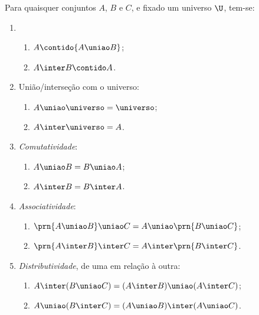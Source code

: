 \begin{proposition}
	\label{prop:uniao-e-intersecao}
	Para quaisquer conjuntos $A$, $B$ e $C$, e fixado um universo $\U$, tem-se:
	\begin{enumerate}
		\item
			\begin{enumerate}
				\label{prop:uniao-e-intersecao-inclusao}
				\item
					$A \contido {A \uniao B}$;
				\item
					${A \inter B} \contido A$.
			\end{enumerate}

		\item
			União/interseção com o universo:
			\begin{enumerate}
				\item $A \uniao \universo = \universo$;
				\item $A \inter \universo = A$.
			\end{enumerate}

		\item
			\emph{Comutatividade}:
			\begin{enumerate}
				\item $A \uniao B = B \uniao A$;
				\item $A \inter B = B \inter A$.
			\end{enumerate}

		\item
			\emph{Associatividade}:
			\begin{enumerate}
				\item $\prn{A \uniao B} \uniao C = A \uniao \prn{ B \uniao C}$;
				\item $\prn{A \inter B} \inter C = A \inter \prn{ B \inter C}$.
			\end{enumerate}

		\item
			\emph{Distributividade}, de uma em relação à outra:
			\begin{enumerate}
				\item $A \inter (B \uniao C) = (A \inter B) \uniao (A \inter C)$;
				\item $A \uniao (B \inter C) = (A \uniao B) \inter (A \uniao C)$.
			\end{enumerate}

	\end{enumerate}
\end{proposition}

